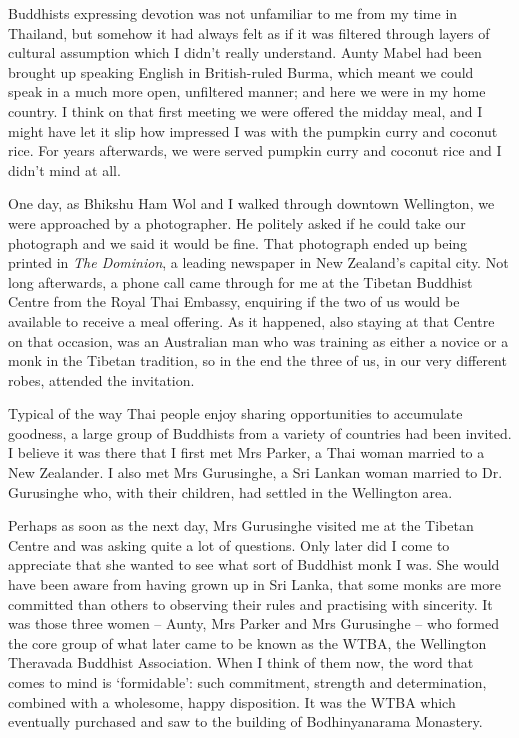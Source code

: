 Buddhists expressing devotion was not unfamiliar to me from my time in
Thailand, but somehow it had always felt as if it was filtered through
layers of cultural assumption which I didn't really understand. Aunty
Mabel had been brought up speaking English in British-ruled Burma, which
meant we could speak in a much more open, unfiltered manner; and here we
were in my home country. I think on that first meeting we were offered
the midday meal, and I might have let it slip how impressed I was with
the pumpkin curry and coconut rice. For years afterwards, we were served
pumpkin curry and coconut rice and I didn't mind at all.

One day, as Bhikshu Ham Wol and I walked through downtown Wellington, we
were approached by a photographer. He politely asked if he could take
our photograph and we said it would be fine. That photograph ended up
being printed in \emph{The Dominion}, a leading newspaper in New
Zealand's capital city. Not long afterwards, a phone call came through
for me at the Tibetan Buddhist Centre from the Royal Thai Embassy,
enquiring if the two of us would be available to receive a meal
offering. As it happened, also staying at that Centre on that occasion,
was an Australian man who was training as either a novice or a monk in
the Tibetan tradition, so in the end the three of us, in our very
different robes, attended the invitation.

Typical of the way Thai people enjoy sharing opportunities to accumulate
goodness, a large group of Buddhists from a variety of countries had
been invited. I believe it was there that I first met Mrs Parker, a Thai
woman married to a New Zealander. I also met Mrs Gurusinghe, a Sri
Lankan woman married to Dr. Gurusinghe who, with their children, had
settled in the Wellington area.

Perhaps as soon as the next day, Mrs Gurusinghe visited me at the
Tibetan Centre and was asking quite a lot of questions. Only later did I
come to appreciate that she wanted to see what sort of Buddhist monk I
was. She would have been aware from having grown up in Sri Lanka, that
some monks are more committed than others to observing their rules and
practising with sincerity. It was those three women -- Aunty, Mrs Parker
and Mrs Gurusinghe -- who formed the core group of what later came to be
known as the WTBA, the Wellington Theravada Buddhist Association. When I
think of them now, the word that comes to mind is `formidable': such
commitment, strength and determination, combined with a wholesome, happy
disposition. It was the WTBA which eventually purchased and saw to the
building of Bodhinyanarama Monastery\cite{bodhinyanarama}.

